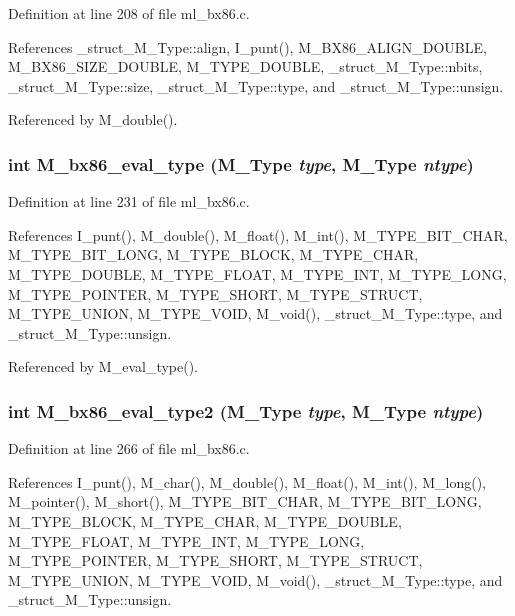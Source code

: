 Definition at line 208 of file ml\_\-bx86.c.

References \_\-struct\_\-M\_\-Type::align, I\_\-punt(), M\_\-BX86\_\-ALIGN\_\-DOUBLE, M\_\-BX86\_\-SIZE\_\-DOUBLE, M\_\-TYPE\_\-DOUBLE, \_\-struct\_\-M\_\-Type::nbits, \_\-struct\_\-M\_\-Type::size, \_\-struct\_\-M\_\-Type::type, and \_\-struct\_\-M\_\-Type::unsign.

Referenced by M\_\-double().
\subsubsection{\setlength{\rightskip}{0pt plus 5cm}int M\_\-bx86\_\-eval\_\-type (\bf{M\_\-Type} {\em type}, \bf{M\_\-Type} {\em ntype})}\label{m__bx86_8h_9a666f0e87bd84c7d16dab6c4603d6b3}




Definition at line 231 of file ml\_\-bx86.c.

References I\_\-punt(), M\_\-double(), M\_\-float(), M\_\-int(), M\_\-TYPE\_\-BIT\_\-CHAR, M\_\-TYPE\_\-BIT\_\-LONG, M\_\-TYPE\_\-BLOCK, M\_\-TYPE\_\-CHAR, M\_\-TYPE\_\-DOUBLE, M\_\-TYPE\_\-FLOAT, M\_\-TYPE\_\-INT, M\_\-TYPE\_\-LONG, M\_\-TYPE\_\-POINTER, M\_\-TYPE\_\-SHORT, M\_\-TYPE\_\-STRUCT, M\_\-TYPE\_\-UNION, M\_\-TYPE\_\-VOID, M\_\-void(), \_\-struct\_\-M\_\-Type::type, and \_\-struct\_\-M\_\-Type::unsign.

Referenced by M\_\-eval\_\-type().
\subsubsection{\setlength{\rightskip}{0pt plus 5cm}int M\_\-bx86\_\-eval\_\-type2 (\bf{M\_\-Type} {\em type}, \bf{M\_\-Type} {\em ntype})}\label{m__bx86_8h_2013319ca9900a4b7225399b6f3a9fa6}




Definition at line 266 of file ml\_\-bx86.c.

References I\_\-punt(), M\_\-char(), M\_\-double(), M\_\-float(), M\_\-int(), M\_\-long(), M\_\-pointer(), M\_\-short(), M\_\-TYPE\_\-BIT\_\-CHAR, M\_\-TYPE\_\-BIT\_\-LONG, M\_\-TYPE\_\-BLOCK, M\_\-TYPE\_\-CHAR, M\_\-TYPE\_\-DOUBLE, M\_\-TYPE\_\-FLOAT, M\_\-TYPE\_\-INT, M\_\-TYPE\_\-LONG, M\_\-TYPE\_\-POINTER, M\_\-TYPE\_\-SHORT, M\_\-TYPE\_\-STRUCT, M\_\-TYPE\_\-UNION, M\_\-TYPE\_\-VOID, M\_\-void(), \_\-struct\_\-M\_\-Type::type, and \_\-struct\_\-M\_\-Type::unsign.


